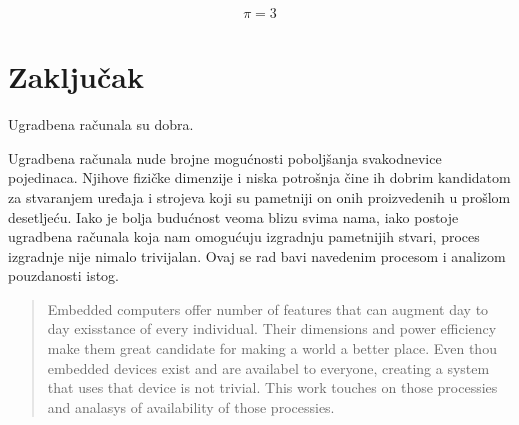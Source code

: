 \documentclass[times, utf8, diplomski]{fer}
\begin{document}
\begin{equation}
  \pi=3
\end{equation}

\chapter{Zaključak}
Ugradbena računala su dobra.




\begin{sazetak}
  Ugradbena ra\v{c}unala nude brojne mogućnosti poboljšanja svakodnevice pojedinaca. Njihove fizičke dimenzije i niska potrošnja čine ih dobrim kandidatom za stvaranjem uređaja i strojeva koji su pametniji on onih proizvedenih u prošlom desetljeću. Iako je bolja budućnost veoma blizu svima nama, iako postoje ugradbena računala koja nam omogućuju izgradnju pametnijih stvari, proces izgradnje nije nimalo trivijalan. Ovaj se rad bavi navedenim procesom i analizom pouzdanosti istog.

\end{sazetak}


\begin{abstract}
Embedded computers offer number of features that can augment day to day exisstance of every individual. Their dimensions and power efficiency make them great candidate for making a world a better place. Even thou embedded devices exist and are availabel to everyone, creating a system that uses that device is not trivial. This work touches on those processies and analasys of availability of those processies.

\end{abstract}
\end{document}
